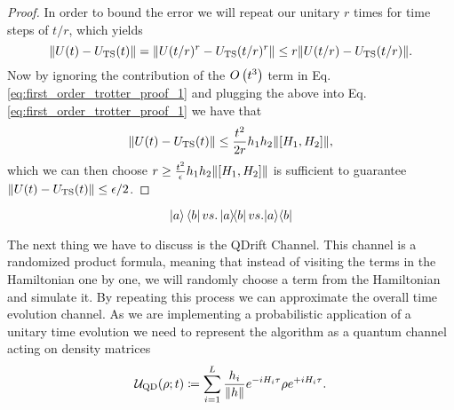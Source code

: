 \begin{proof}
    In order to bound the error we will repeat our unitary $r$ times for time steps of $t/r$, which yields
    \begin{equation}
        \norm{U(t) - U_{\rm TS}(t)} = \norm{U(t/r)^r - U_{\rm TS}(t/r)^r} \le r \norm{U(t/r) - U_{\rm TS}(t/r)}.
    \end{equation}
    Now by ignoring the contribution of the $O\left( t^3 \right)$ term in Eq. \ref{eq:first_order_trotter_proof_1} and plugging the above into Eq. \ref{eq:first_order_trotter_proof_1} we have that 
    \begin{equation}
        \norm{U(t) - U_{\rm TS}(t)} \le \frac{t^2}{2 r} h_1 h_2 \norm{[H_1, H_2]},
    \end{equation}
    which we can then choose $r \ge \frac{t^2}{\epsilon}h_1 h_2 \norm{[H_1, H_2]}$ is sufficient to guarantee $\norm{U(t) - U_{\rm TS}(t)} \le \epsilon / 2$.
\end{proof}

$$\ket{a}\bra{b} vs. \ketbra{a}{b} vs. |a\rangle\langle b|$$

The next thing we have to discuss is the QDrift Channel. This channel is a randomized product formula, meaning that instead of visiting the terms in the Hamiltonian one by one, we will randomly choose a term from the Hamiltonian and simulate it. By repeating this process we can approximate the overall time evolution channel. As we are implementing a probabilistic application of a unitary time evolution we need to represent the algorithm as a quantum channel acting on density matrices
\begin{equation}
    \mathcal{U}_{\rm QD}(\rho; t) \coloneqq \sum_{i = 1}^L \frac{h_i}{\norm{h}} e^{-i H_i \tau} \rho e^{+i H_i \tau}.
\end{equation}


